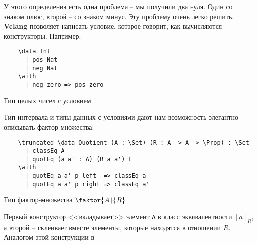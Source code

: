 У этого определения есть одна проблема -- мы получили два нуля. Один со знаком плюс, второй -- со знаком минус. Эту проблему очень легко решить. \textbf{Vclang} позволяет написать условие, которое говорит, как вычисляются конструкторы. Например:

\begin{listing}[H]
  \begin{verbatim}
    \data Int
      | pos Nat
      | neg Nat
    \with
      | neg zero => pos zero
  \end{verbatim}
  \caption{Тип целых чисел с условием}
\end{listing}

Тип интервала и типы данных с условиями дают нам возможность элегантно описывать фактор-множества:

\begin{listing}[H]
  \begin{verbatim}
    \truncated \data Quotient (A : \Set) (R : A -> A -> \Prop) : \Set
      | classEq A
      | quotEq (a a' : A) (R a a') I
    \with
      | quotEq a a' p left  => classEq a
      | quotEq a a' p right => classEq a'
  \end{verbatim}
  \caption{Тип фактор-множества $\faktor{A}{R}$}
\end{listing}

Первый конструктор <<вкладывает>> элемент \texttt{A} в класс эквивалентности $[a]_{R}$, а второй -- склеивает вместе элементы, которые находятся в отношении $R$. Аналогом этой конструкции в 
